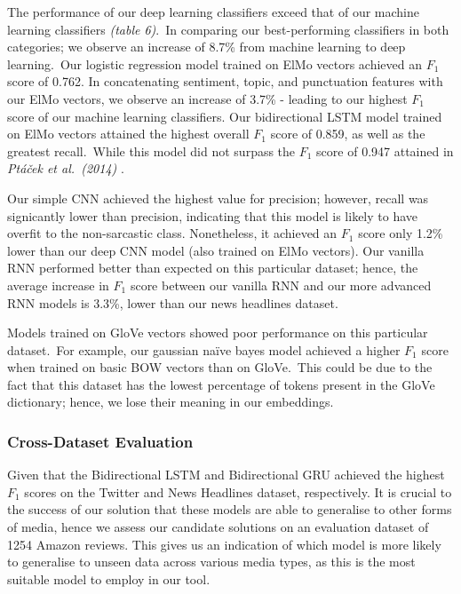 \documentclass[12pt,a4paper]{article}
\begin{document}
\noindent The performance of our deep learning classifiers exceed that of our machine learning classifiers \textit{(table 6)}.\ In comparing our best-performing classifiers in both categories; we observe an increase of 8.7\% from machine learning to deep learning.\ Our logistic regression model trained on ElMo vectors achieved an $F_1$ score of 0.762. In concatenating sentiment, topic, and punctuation features with our ElMo vectors, we observe an increase of 3.7\% - leading to our highest $F_1$ score of our machine learning classifiers. Our bidirectional LSTM model trained on ElMo vectors attained the highest overall $F_1$ score of 0.859, as well as the greatest recall.\ While this model did not surpass the $F_1$ score of 0.947 attained in \textit{Pt\'a\v{c}ek et al.\ (2014)} \cite{ptavcek2014sarcasm}. 

Our simple CNN achieved the highest value for precision; however, recall was signicantly lower than precision, indicating that this model is likely to have overfit to the non-sarcastic class. Nonetheless, it achieved an $F_1$ score only 1.2\% lower than our deep CNN model (also trained on ElMo vectors). Our vanilla RNN performed better than expected on this particular dataset; hence, the average increase in $F_1$ score between our vanilla RNN and our more advanced RNN models is 3.3\%, lower than our news headlines dataset.

Models trained on GloVe vectors showed poor performance on this particular dataset.\ For example, our gaussian na\"{i}ve bayes model achieved a higher $F_1$ score when trained on basic BOW vectors than on GloVe.\ This could be due to the fact that this dataset has the lowest percentage of tokens present in the GloVe dictionary; hence, we lose their meaning in our embeddings.\\\vspace{-15pt}


\subsubsection{Cross-Dataset Evaluation}
Given that the Bidirectional LSTM and Bidirectional GRU achieved the highest $F_1$ scores on the Twitter and News Headlines dataset, respectively. It is crucial to the success of our solution that these models are able to generalise to other forms of media, hence we assess our candidate solutions on an evaluation dataset of 1254 Amazon reviews. This gives us an indication of which model is more likely to generalise to unseen data across various media types, as this is the most suitable model to employ in our tool.
\end{document}
